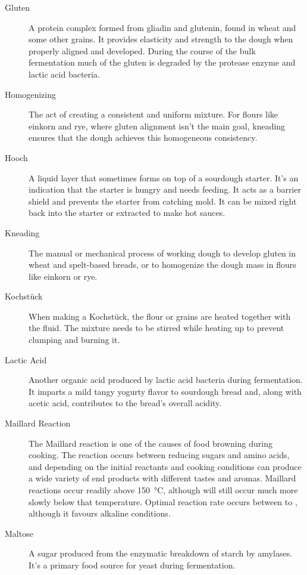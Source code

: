 \begin{description}
\item[Gluten] A protein complex formed from gliadin and glutenin, found in wheat
and some other grains. It provides elasticity and strength to the dough when
properly aligned and developed. During the course of the bulk fermentation much of
the gluten is degraded by the protease enzyme and lactic acid bacteria.

\item[Homogenizing] The act of creating a consistent and uniform mixture. For
flours like einkorn and rye, where gluten alignment isn't the main goal, kneading
ensures that the dough achieves this homogeneous consistency.

\item[Hooch] A liquid layer that sometimes forms on top of a sourdough starter.
It's an indication that the starter is hungry and needs feeding. It acts as a
barrier shield and prevents the starter from catching mold. It can be mixed right
back into the starter or extracted to make hot sauces.

\item[Kneading] The manual or mechanical process of working dough to develop gluten
in wheat and spelt-based breads, or to homogenize the dough mass in flours like
einkorn or rye.

\item[Kochstück] When making a Kochstück, the flour or grains are heated
together with the fluid. The mixture needs to be stirred while heating up
to prevent clumping and burning it.

\item[Lactic Acid] Another organic acid produced by lactic acid bacteria during
fermentation. It imparts a mild tangy yogurty flavor to sourdough bread and, along
with acetic acid, contributes to the bread's overall acidity.

\item[Maillard Reaction] The Maillard reaction is one of the causes of food browning
during cooking. The reaction occurs between reducing sugars and amino acids, and
depending on the initial reactants and cooking conditions can produce a wide variety
of end products with different tastes and aromas. Maillard reactions occur readily
above \SI{150}{\celsius}, although will still occur much more slowly below that
temperature. Optimal reaction rate occurs between  to ,
although it favours alkaline conditions.

\item[Maltose] A sugar produced from the enzymatic breakdown of starch by amylases.
It's a primary food source for yeast during fermentation.


\end{description}

